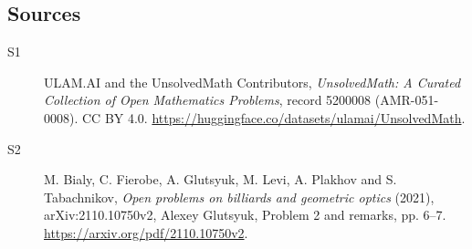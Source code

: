 \documentclass[11pt]{article}
\begin{document}
\subsection{Sources}
\begin{description}
\item[\hypertarget{source:5200008:1}{S1}] ULAM.AI and the UnsolvedMath Contributors, \emph{UnsolvedMath: A Curated Collection of Open Mathematics Problems}, record 5200008 (AMR-051-0008). CC BY 4.0. \url{https://huggingface.co/datasets/ulamai/UnsolvedMath}.
\item[\hypertarget{source:5200008:2}{S2}] M. Bialy, C. Fierobe, A. Glutsyuk, M. Levi, A. Plakhov and S. Tabachnikov, \emph{Open problems on billiards and geometric optics} (2021), arXiv:2110.10750v2, Alexey Glutsyuk, Problem 2 and remarks, pp. 6--7. \url{https://arxiv.org/pdf/2110.10750v2}.
\end{description}
\label{end:5200008}
\end{document}

